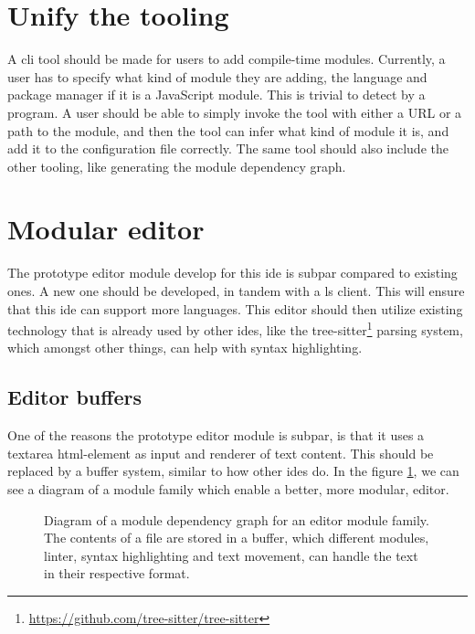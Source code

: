 \section{Unify the tooling}

A \gls{cli} tool should be made for users to add compile-time modules.
Currently, a user has to specify what kind of module they are adding, the
language and package manager if it is a JavaScript module. This is trivial to
detect by a program. A user should be able to simply invoke the tool with
either a URL or a path to the module, and then the tool can infer what kind of
module it is, and add it to the configuration file correctly. The same tool
should also include the other tooling, like generating the module dependency
graph.

\section{Modular editor}

The prototype editor module develop for this \gls*{ide} is subpar compared to
existing ones. A new one should be developed, in tandem with a \gls*{ls} client.
This will ensure that this \gls*{ide} can support more languages. This editor
should then utilize existing technology that is already used by other
\gls*{ide}s, like the tree-sitter\footnote{\url{https://github.com/tree-sitter/tree-sitter}}
parsing system, which amongst other things, can help with syntax highlighting.

\subsection{Editor buffers}

One of the reasons the prototype editor module is subpar, is that it uses a
textarea \gls*{html}-element as input and renderer of text content. This should
be replaced by a buffer system, similar to how other \gls*{ide}s do. In the
figure \ref{fig:editorBuffer}, we can see a diagram of a module family which
enable a better, more modular, editor.

\begin{figure}
  \centering
  
  \caption{
    Diagram of a module dependency graph for an editor module family. The
    contents of a file are stored in a buffer, which different modules, linter,
    syntax highlighting and text movement, can handle the text in their
    respective format.
  }
  \label{fig:editorBuffer}
\end{figure}

